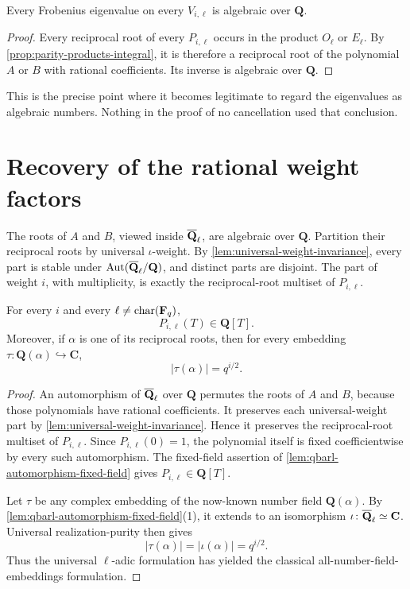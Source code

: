 \begin{corollary}
\label{cor:eigenvalues-algebraic-over-Q}
Every Frobenius eigenvalue on every \(V_{i,\ell}\) is algebraic over
\(\mathbf Q\).
\end{corollary}

\begin{proof}
Every reciprocal root of every \(P_{i,\ell}\) occurs in the product
\(O_\ell\) or \(E_\ell\).  By
\cref{prop:parity-products-integral}, it is therefore a reciprocal root
of the polynomial \(A\) or \(B\) with rational coefficients.  Its
inverse is algebraic over \(\mathbf Q\).
\end{proof}

This is the precise point where it becomes legitimate to regard the
eigenvalues as algebraic numbers.  Nothing in the proof of no
cancellation used that conclusion.

\section{Recovery of the rational weight factors}

The roots of \(A\) and \(B\), viewed inside \(\overline{\mathbf Q}_\ell\), are algebraic over
\(\mathbf Q\).  Partition their reciprocal roots by universal
\(\iota\)-weight.  By
\cref{lem:universal-weight-invariance}, every part is stable under
\(\operatorname{Aut}(\overline{\mathbf Q}_\ell/\mathbf Q)\), and distinct parts are
disjoint.  The part of weight \(i\), with multiplicity, is exactly the
reciprocal-root multiset of \(P_{i,\ell}\).

\begin{theorem}
\label{thm:rational-individual-factors}
For every \(i\) and every \(\ell\neq\operatorname{char}(\mathbf F_q)\),
\[
  P_{i,\ell}(T)\in\mathbf Q[T].
\]
Moreover, if \(\alpha\) is one of its reciprocal roots, then for every
embedding
\(\tau\colon\mathbf Q(\alpha)\hookrightarrow\mathbf C\),
\[
  |\tau(\alpha)|=q^{i/2}.
  \tag{14.4}\label{eq:classical-all-embeddings}
\]
\end{theorem}

\begin{proof}
An automorphism of \(\overline{\mathbf Q}_\ell\) over \(\mathbf Q\) permutes the roots of
\(A\) and \(B\), because those polynomials have rational coefficients.
It preserves each universal-weight part by
\cref{lem:universal-weight-invariance}.  Hence it preserves the
reciprocal-root multiset of \(P_{i,\ell}\).  Since
\(P_{i,\ell}(0)=1\), the polynomial itself is fixed coefficientwise by
every such automorphism.  The fixed-field assertion of
\cref{lem:qbarl-automorphism-fixed-field} gives
\(P_{i,\ell}\in\mathbf Q[T]\).

Let \(\tau\) be any complex embedding of the now-known number field
\(\mathbf Q(\alpha)\).  By
\cref{lem:qbarl-automorphism-fixed-field}(1), it extends to an isomorphism
\(\iota\colon\overline{\mathbf Q}_\ell\simeq\mathbf C\).  Universal realization-purity then
gives
\[
 |\tau(\alpha)|=|\iota(\alpha)|=q^{i/2}.
\]
Thus the universal \(\ell\)-adic formulation has yielded the classical
all-number-field-embeddings formulation.
\end{proof}

